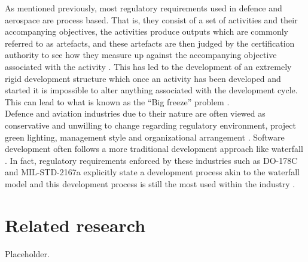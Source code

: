 \documentclass[11pt,twocolumn]{article}
\begin{document}
As mentioned previously, most regulatory requirements used in defence and aerospace are process based. That is, they consist of a set of activities and their accompanying objectives, the activities produce outputs which are commonly referred to as artefacts, and these artefacts are then judged by the certification authority to see how they measure up against the accompanying objective associated with the activity \citep{esposito2011investigation}. This has led to the development of an extremely rigid development structure which once an activity has been developed and started it is impossible to alter anything associated with the development cycle. This can lead to what is known as the “Big freeze” problem \citep{cleland2014achieving}.
\\
Defence and aviation industries due to their nature are often viewed as conservative and unwilling to change regarding regulatory environment, project green lighting, management style and organizational arrangement \citep{vanderleest2009escape}. Software development often follows a more traditional development approach like waterfall \citep{balaji2012waterfall}.  In fact, regulatory requirements enforced by these industries such as DO-178C and MIL-STD-2167a explicitly state a development process akin to the waterfall model and this development process is still the most used within the industry \citep{boralliapplying}. 

\section*{\textbf{Related research}}
Placeholder.
\end{document}
